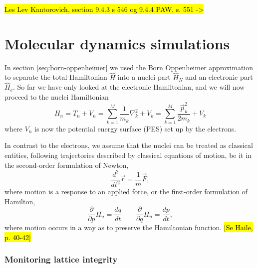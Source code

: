 \documentclass[11pt,bibliography=totoc,index=totoc]{scrbook}   %
\newcommand{\comment}[1]{\hl{#1}}
\begin{document}
\comment{Les Lev Kantorovich, section 9.4.3 s 546 og 9.4.4 PAW, s. 551 ->}

\chapter{Molecular dynamics simulations}\label{seq:molecular-dynamics}

In section \ref{seq:born-oppenheimer} we used the Born Oppenheimer approximation to separate the total Hamiltonian $\hat{H}$ into a nuclei part $\hat{H}_N$ and an electronic part $\hat{H}_e$. 
So far we have only looked at the electronic Hamiltonian, and we will now proceed to the nuclei Hamiltonian
\begin{equation}
  H_n = T_n + V_n = \sum_{k=1}^M \frac{1}{m_k}\nabla_k^2 + V_k = \sum_{k=1}^M \frac{\vec{p}_k^2}{2m_k} + V_k
  \label{eq:nucleiHamiltonian}
\end{equation}
where $V_n$ is now the potential energy surface (PES) set up by the electrons.

In contrast to the electrons, we assume that the nuclei can be treated as classical entities, following trajectories described by 
classical equations of motion, be it in the
second-order formulation of Newton,
\begin{equation}
  \frac{d^2}{d t^2} \vec{r} = \frac{1}{m}\vec{F},
\end{equation}
where motion is a response to an applied force,
or the first-order formulation of Hamilton,
\begin{equation}
  \frac{\partial}{\partial p} H_n = \frac{dq}{dt} \qquad
  \frac{\partial}{\partial q} H_n = \frac{dp}{dt},
\end{equation}
where motion occurs in a way as to preserve the Hamiltonian function.
\comment{[Se Haile, p. 40-42]}

\subsection{Monitoring lattice integrity}
\end{document}
